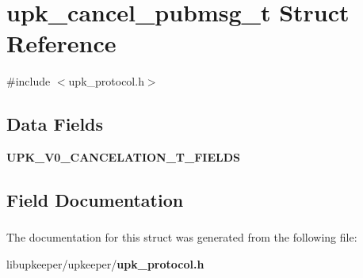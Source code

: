 \section{upk\_\-cancel\_\-pubmsg\_\-t Struct Reference}
\label{structupk__cancel__pubmsg__t}


{\ttfamily \#include $<$upk\_\-protocol.h$>$}

\subsection*{Data Fields}
\begin{DoxyCompactItemize}
\item 
{\bf UPK\_\-V0\_\-CANCELATION\_\-T\_\-FIELDS}
\end{DoxyCompactItemize}


\subsection{Field Documentation}
\subsubsection[{UPK\_\-V0\_\-CANCELATION\_\-T\_\-FIELDS}]{}\label{structupk__cancel__pubmsg__t_a3e53a846454cd0cbdf06ac5dd503c8bc}


The documentation for this struct was generated from the following file:\begin{DoxyCompactItemize}
\item 
libupkeeper/upkeeper/{\bf upk\_\-protocol.h}\end{DoxyCompactItemize}
